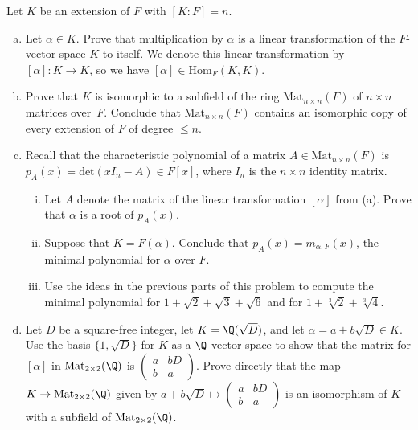 \documentclass[10pt]{amsart}
\begin{document}
\begin{thm}
  Let $K$ be an extension of $F$ with $[K : F] = n$.  
  \begin{enumerate}[(a)]
  \item
    Let $\alpha\in K$.  Prove that multiplication by $\alpha$ is a linear transformation of the $F$-vector space 
    $K$ to itself.  We denote this linear transformation by $[\alpha] : K \rightarrow K$, so we have 
    $[\alpha] \in \text{Hom}_{F}(K, K)$.     
  \item 
    Prove that $K$ is isomorphic to a subfield of the ring $\text{Mat}_{n\times n}(F)$ of $n\times n$ 
    matrices over~$F$.  Conclude that $\text{Mat}_{n\times n}(F)$ contains an isomorphic copy of every
    extension of $F$ of degree $\leq n$.  
  \item 
    Recall that the characteristic polynomial of a matrix $A\in \text{Mat}_{n\times n}(F)$ is $p_{A}(x) 
    = \text{det}(xI_n - A)\in F[x]$, where $I_n$ is the $n\times n$ identity matrix.  
    \begin{enumerate}[(i)]
    \item 
      Let $A$ denote the matrix of the linear transformation $[\alpha]$ from (a).  
      Prove that $\alpha$ is a root of $p_{A}(x)$. 
    \item 
      Suppose that $K = F(\alpha)$.  Conclude that $p_{A}(x) = m_{\alpha, F}(x)$, the minimal polynomial 
      for $\alpha$ over $F$.  
    \item 
      Use the ideas in the previous parts of this problem to compute the minimal polynomial for 
      $1 + \sqrt{2} + \sqrt{3} + \sqrt{6}$ and for $1 + \sqrt[3]{2} + \sqrt[3]{4}$.    
    \end{enumerate}
  \item 
    Let $D$ be a square-free integer, let  $K = \Q(\sqrt{D})$, and let $\alpha = a + b\sqrt{D}\in K$.  
    Use the basis $\{1, \sqrt{D}\}$ for $K$ as a $\Q$-vector space to show that the matrix for $[\alpha]$
    in $\text{Mat}_{2\times 2}(\Q)$ is $\begin{pmatrix} a & bD \\ b & a \end{pmatrix}$.  
    Prove directly that the map $K \rightarrow \text{Mat}_{2\times 2}(\Q)$ given by 
    $a + b\sqrt{D} \mapsto \begin{pmatrix} a & bD \\ b & a\end{pmatrix}$ is an isomorphism of 
      $K$ with a subfield of $\text{Mat}_{2\times 2}(\Q)$.  
  \end{enumerate}


\end{thm}
\end{document}
